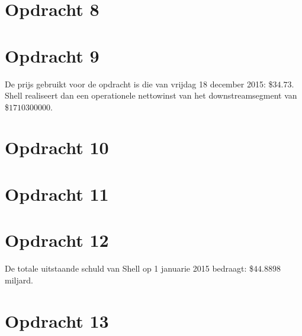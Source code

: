 \documentclass[11pt,a4paper]{article}
\begin{document}
\section*{Opdracht 8}



\section*{Opdracht 9}
De prijs gebruikt voor de opdracht is die van vrijdag 18 december 2015: \$$34.73$.
Shell realiseert dan een operationele nettowinst van het downstreamsegment van \$$1710300000$.



\section*{Opdracht 10}



\section*{Opdracht 11}



\section*{Opdracht 12}
De totale uitstaande schuld van Shell op 1 januarie 2015 bedraagt: \$$44.8898$ miljard.


\section*{Opdracht 13}
\end{document}
